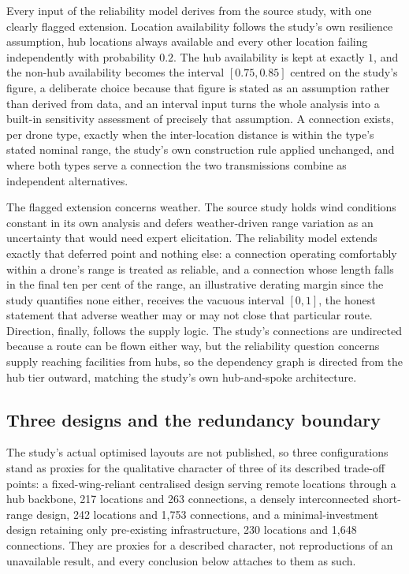 \documentclass[12pt]{report}
\begin{document}
Every input of the reliability model derives from the source study, with one clearly flagged extension. Location availability follows the study's own resilience assumption, hub locations always available and every other location failing independently with probability $0.2$. The hub availability is kept at exactly $1$, and the non-hub availability becomes the interval $[0.75, 0.85]$ centred on the study's figure, a deliberate choice because that figure is stated as an assumption rather than derived from data, and an interval input turns the whole analysis into a built-in sensitivity assessment of precisely that assumption. A connection exists, per drone type, exactly when the inter-location distance is within the type's stated nominal range, the study's own construction rule applied unchanged, and where both types serve a connection the two transmissions combine as independent alternatives.

The flagged extension concerns weather. The source study holds wind conditions constant in its own analysis and defers weather-driven range variation as an uncertainty that would need expert elicitation. The reliability model extends exactly that deferred point and nothing else: a connection operating comfortably within a drone's range is treated as reliable, and a connection whose length falls in the final ten per cent of the range, an illustrative derating margin since the study quantifies none either, receives the vacuous interval $[0,1]$, the honest statement that adverse weather may or may not close that particular route. Direction, finally, follows the supply logic. The study's connections are undirected because a route can be flown either way, but the reliability question concerns supply reaching facilities from hubs, so the dependency graph is directed from the hub tier outward, matching the study's own hub-and-spoke architecture.

\subsection{Three designs and the redundancy boundary}
\label{sec:pp-case-designs}

The study's actual optimised layouts are not published, so three configurations stand as proxies for the qualitative character of three of its described trade-off points: a fixed-wing-reliant centralised design serving remote locations through a hub backbone, 217 locations and 263 connections, a densely interconnected short-range design, 242 locations and 1{,}753 connections, and a minimal-investment design retaining only pre-existing infrastructure, 230 locations and 1{,}648 connections. They are proxies for a described character, not reproductions of an unavailable result, and every conclusion below attaches to them as such.
\end{document}

